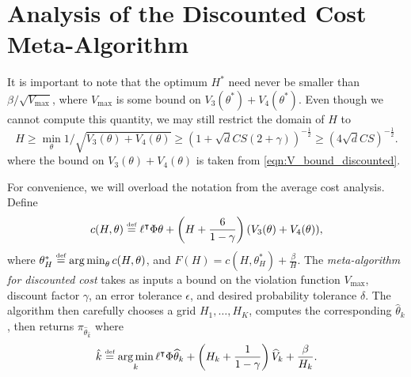 \documentclass[11pt]{article}
\newcommand{\df}{\stackrel{\mbox{\rm\tiny def}}{=}}
\begin{document}
\section{Analysis of the Discounted Cost Meta-Algorithm}
\label{sec:meta.analysis.discounted}
It is important to note that the optimum $H^*$ need never be smaller than $\beta/\sqrt{V_{\max}}$, where $V_{\max}$ is some bound on $V_3(\theta^*)+ V_4(\theta^*)$. Even though we cannot compute this quantity, we may still restrict the domain of $H$ to
\begin{equation*}
   H \geq \min_\theta 1/\sqrt{V_3(\theta) + V_4(\theta)}
   \geq
   \left(1+\sqrt{d}CS(2+\gamma)\right)^{-\frac12}
   \geq
      \left(4\sqrt{d}CS\right)^{-\frac12}
      .
  \end{equation*}
where the bound on $V_3(\theta) + V_4(\theta)$ is taken from \eqref{eqn:V_bound_discounted}.

For convenience, we will overload the notation from the  average cost analysis. Define
\[
  c(H,\theta) \df \ell^\top\Phi\theta + \left(H+\frac{6}{1-\gamma}\right)(V_3(\theta)+V_4(\theta)),
\]
where $\theta_H^* \df \argmin_\theta c(H,\theta)$, and $F(H) = c(H,\theta^*_H) + \frac{\beta}{H}$.
The \emph{meta-algorithm for discounted cost} takes as inputs a bound on the violation function $V_{\max}$, discount factor $\gamma$, an error tolerance $\epsilon$, and desired probability tolerance $\delta$. The algorithm then carefully chooses a grid $H_1,\ldots, H_K$, computes the corresponding $\widehat\theta_k$, then returns $\pi_{\widehat\theta_{\hat k}}$ where 
\begin{equation*}
    \hat k \df \argmin_k \ell^\top\Phi\widehat\theta_k + \left(H_k+\frac{1}{1-\gamma}\right) \widehat V_k + \frac{\beta}{H_k}.
  \end{equation*}
\end{document}
